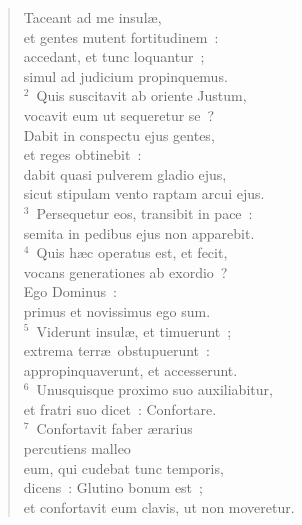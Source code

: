 \begin{flushleft}\begin{verse}\vspace{-19pt}\hspace{6pt}Taceant ad me insul\ae ,\\\hspace{6pt} et gentes mutent fortitudinem~:\\ accedant, et tunc loquantur~;\\ simul ad judicium propinquemus.\\
${}^{2}$~Quis suscitavit ab oriente Justum,\\ vocavit eum ut sequeretur se~?\\ Dabit in conspectu ejus gentes,\\ et reges obtinebit~:\\ dabit quasi pulverem gladio ejus,\\ sicut stipulam vento raptam arcui ejus.\\
${}^{3}$~Persequetur eos, transibit in pace~:\\ semita in pedibus ejus non apparebit.\\
${}^{4}$~Quis h\ae c operatus est, et fecit,\\ vocans generationes ab exordio~?\\ Ego Dominus~:\\ primus et novissimus ego sum.\\
${}^{5}$~Viderunt insul\ae , et timuerunt~;\\ extrema terr\ae\ obstupuerunt~:\\ appropinquaverunt, et accesserunt.\\
${}^{6}$~Unusquisque proximo suo auxiliabitur,\\ et fratri suo dicet~: Confortare.\\
${}^{7}$~Confortavit faber \ae rarius\\ percutiens malleo\\ eum, qui cudebat tunc temporis,\\ dicens~: Glutino bonum est~;\\ et confortavit eum clavis, ut non moveretur.\end{verse}\end{flushleft}


